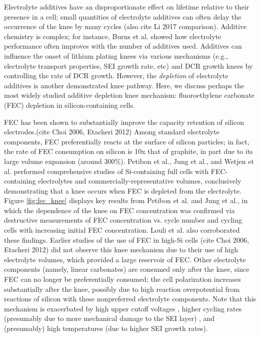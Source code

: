 \documentclass{article}
\begin{document}
Electrolyte additives have an disproportionate effect on lifetime relative to their presence in a cell; small quantities of electrolyte additives can often delay the occurrence of the knee by many cycles\cite{ma_editors_2019} (also cite Li 2017 comparison). Additive chemistry is complex; for instance, Burns et al.\cite{burns_predicting_2013} showed how electrolyte performance often improves with the number of additives used. Additives can influence the onset of lithium plating knees via various mechanisms (e.g., electrolyte transport properties, SEI growth rate, etc) and DCR growth knees by controlling the rate of DCR growth\cite{ma_editors_2019}. However, the \emph{depletion} of electrolyte additives is another demonstrated knee pathway. Here, we discuss perhaps the most widely studied additive depletion knee mechanism: fluoroethylene carbonate (FEC) depletion in silicon-containing cells.

FEC has been shown to substantially improve the capacity retention of silicon electrodes.(cite Choi 2006, Etacheri 2012)
Among standard electrolyte components, FEC preferentially reacts at the surface of silicon particles; in fact, the rate of FEC consumption on silicon is 10x that of graphite, in part due to its large volume expansion (around 300\%).\cite{wetjen_differentiating_2017}
Petibon et al.\cite{petibon_studies_2016},
Jung et al.\cite{jung_consumption_2016},
and Wetjen et al.\cite{wetjen_differentiating_2017}
performed comprehensive studies of Si-containing full cells with FEC-containing electrolytes and commercially-representative volumes,
conclusively demonstrating that a knee occurs when FEC is depleted from the electrolyte.
Figure \ref{fig:fec_knee} displays key results from Petibon et al.\cite{petibon_studies_2016} and
Jung et al.\cite{jung_consumption_2016}, in which the dependence of the knee on FEC concentration was confirmed via destructive measurements of FEC concentration vs. cycle number\cite{petibon_studies_2016} and cycling cells with increasing initial FEC concentration\cite{jung_consumption_2016}.
Louli et al.\cite{louli_operando_2019} also corroborated these findings.
Earlier studies of the use of FEC in high-Si cells (cite Choi 2006, Etacheri 2012) did not observe this knee mechanism due to their use of high electrolyte volumes, which provided a large reservoir of FEC.
Other electrolyte components (namely, linear carbonates) are consumed only after the knee, since FEC can no longer be preferentially consumed\cite{petibon_studies_2016}; the cell polarization increases substantially after the knee\cite{petibon_studies_2016, jung_consumption_2016, wetjen_differentiating_2017}, possibly due to high reaction overpotential from reactions of silicon with these nonpreferred electrolyte components.
Note that this mechanism is exacerbated by high upper cutoff voltages \cite{petibon_studies_2016}, higher cycling rates (presumably due to more mechanical damage to the SEI layer) \cite{petibon_studies_2016}, and (presumably) high temperatures (due to higher SEI growth rates).
\end{document}
